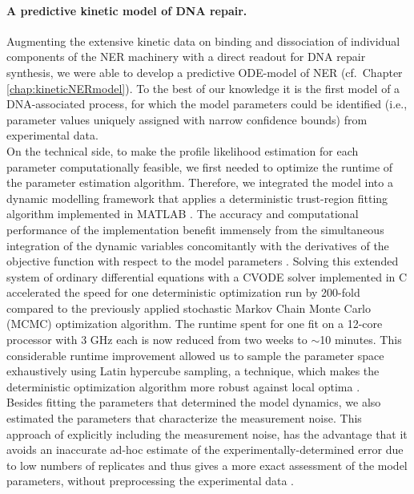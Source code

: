\paragraph{A predictive kinetic model of DNA repair.}
Augmenting the extensive kinetic data on binding and dissociation of individual components of the NER machinery \cite{Luijsterburg2010} with a direct readout for DNA repair synthesis, we were able to develop a predictive ODE-model of NER (cf.\ Chapter \ref{chap:kineticNERmodel}). To the best of our knowledge it is the first model of a DNA-associated process, for which the model parameters could be identified (i.e., parameter values uniquely assigned with narrow confidence bounds) from experimental data. \\
On the technical side, to make the profile likelihood estimation for each parameter computationally feasible, we first needed to optimize the runtime of the parameter estimation algorithm. Therefore, we integrated the model into a dynamic modelling framework that applies a deterministic trust-region fitting algorithm implemented in MATLAB \cite{Raue2009}. The accuracy and computational performance of the implementation benefit immensely from the simultaneous integration of the dynamic variables concomitantly with the derivatives of the objective function with respect to the model parameters \cite{conn2009introduction,Ramachandran2010,Raue2013}. Solving this extended system of ordinary differential equations with a CVODE solver implemented in C accelerated the speed for one deterministic optimization run by 200-fold compared to the previously applied stochastic Markov Chain Monte Carlo (MCMC) optimization algorithm. The runtime spent for one fit on a 12-core processor with 3 GHz each is now reduced from two weeks to $\sim$10 minutes. This considerable runtime improvement allowed us to sample the parameter space exhaustively using Latin hypercube sampling, a technique, which makes the deterministic optimization algorithm more robust against local optima \cite{Raue2013}.\\
Besides fitting the parameters that determined the model dynamics, we also estimated the parameters that characterize the measurement noise. This approach of explicitly including the measurement noise, has the advantage that it avoids an inaccurate ad-hoc estimate of the experimentally-determined error due to low numbers of replicates and thus gives a more exact assessment of the model parameters, without preprocessing the experimental data \cite{Raue2013}. \\
